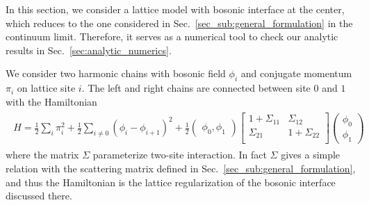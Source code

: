 
In this section, we consider a lattice model with bosonic interface at the center\cite{peschel_exact_2012,calabrese_entanglement_2012}, which reduces to the one considered in Sec.~\ref{sec_sub:general_formulation} in the continuum limit\cite{sakai_entanglement_2008}. Therefore, it serves as a numerical tool to check our analytic results in Sec.~\ref{sec:analytic_numerics}. 


We consider two harmonic chains with bosonic field $\phi_i$ and conjugate momentum $\pi_i$ on lattice site $i$. The left and right chains are connected between site $0$ and $1$ with the Hamiltonian
\begin{eqnarray}\begin{aligned}
H = \frac{1}{2} \sum_i \pi_i^2  +  \frac{1}{2} \sum_{i\ne 0 }  ( \phi_i - \phi_{i+1} )^2  +  \frac{1}{2} \begin{pmatrix}  \phi_0, \phi_1 \end{pmatrix}
\begin{bmatrix}
1 + \Sigma_{11}  & \Sigma_{12} \\
\Sigma_{21} &  1 + \Sigma_{22} \\
\end{bmatrix}
\begin{pmatrix}
\phi_0 \\
\phi_1 
\end{pmatrix}
\end{aligned}\end{eqnarray}
where the matrix $\Sigma$ parameterize two-site interaction. In fact $\Sigma$ gives a simple relation with the scattering matrix defined in Sec.~\ref{sec_sub:general_formulation}, and thus the Hamiltonian is the lattice regularization of the bosonic interface discussed there.


